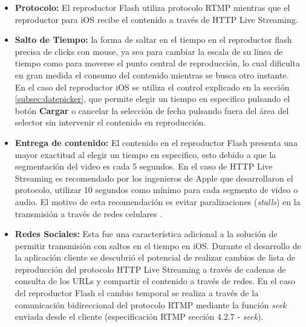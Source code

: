 \begin{itemize}
\item \textbf{Protocolo:} El reproductor Flash utiliza protocolo RTMP mientras que el reproductor para iOS recibe el contenido a través de HTTP Live Streaming.
\item \textbf{Salto de Tiempo:} la forma de saltar en el tiempo en el reproductor flash precisa de clicks con mouse, ya sea para cambiar la escala de su linea de tiempo como para moverse el punto central de reproducción, lo cual dificulta en gran medida el consumo del contenido mientras se busca otro instante.\\

En el caso del reproductor iOS se utiliza el control explicado en la sección \ref{subsec:datepicker}, que permite elegir un tiempo en especifico pulsando el botón \textbf{Cargar} o cancelar la selección de fecha pulsando fuera del área del selector sin intervenir el contenido en reproducción.

\item \textbf{Entrega de contenido:} El contenido en el reproductor Flash presenta una mayor exactitud al elegir un tiempo en especifico, esto debido a que la segmentación del video es cada 5 segundos. En el caso de HTTP Live Streaming es recomendado por los ingenieros de Apple que desarrollaron el protocolo, utilizar 10 segundos como mínimo para cada segmento de video o audio. El motivo de esta recomendación es evitar paralizaciones (\textit{stalls}) en la transmisión a través de redes celulares \cite{bib:tensec-targetduration}.\\

\item \textbf{Redes Sociales:} Esta fue una característica adicional a la solución de permitir transmisión con saltos en el tiempo en iOS. Durante el desarrollo de la aplicación cliente se descubrió el potencial de realizar cambios de lista de reproducción del protocolo HTTP Live Streaming a través de cadenas de consulta de los URLs y compartir el contenido a través de redes. En el caso del reproductor Flash el cambio temporal se realiza a través de la comunicación bidireccional del protocolo RTMP mediante la función \textit{seek} enviada desde el cliente (especificación RTMP \cite{bib:rtmp-specs} sección 4.2.7 - \textit{seek}).
\end{itemize}



